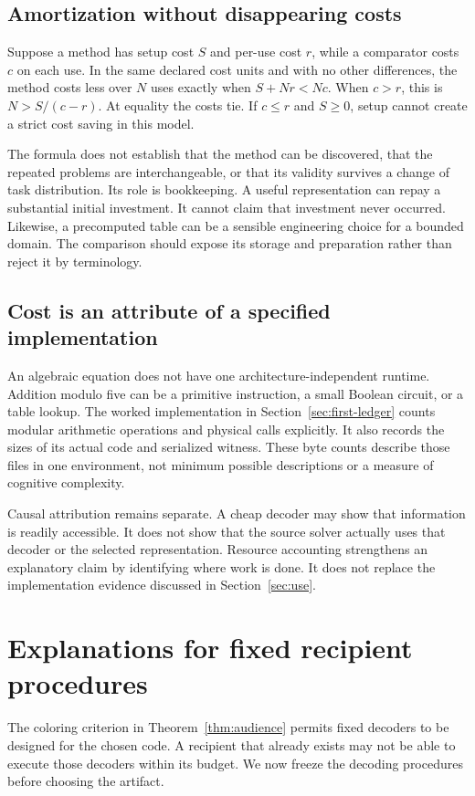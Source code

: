 \documentclass[11pt,letterpaper]{article}
\theoremstyle{plain}
\theoremstyle{definition}
\begin{document}
\subsection{Amortization without disappearing costs}
Suppose a method has setup cost $S$ and per-use cost $r$, while a comparator costs $c$ on each use. In the same declared cost units and with no other differences, the method costs less over $N$ uses exactly when $S+Nr<Nc$. When $c>r$, this is $N>S/(c-r)$. At equality the costs tie. If $c\leq r$ and $S\geq0$, setup cannot create a strict cost saving in this model.

The formula does not establish that the method can be discovered, that the repeated problems are interchangeable, or that its validity survives a change of task distribution. Its role is bookkeeping. A useful representation can repay a substantial initial investment. It cannot claim that investment never occurred. Likewise, a precomputed table can be a sensible engineering choice for a bounded domain. The comparison should expose its storage and preparation rather than reject it by terminology.

\subsection{Cost is an attribute of a specified implementation}
An algebraic equation does not have one architecture-independent runtime. Addition modulo five can be a primitive instruction, a small Boolean circuit, or a table lookup. The worked implementation in Section~\ref{sec:first-ledger} counts modular arithmetic operations and physical calls explicitly. It also records the sizes of its actual code and serialized witness. These byte counts describe those files in one environment, not minimum possible descriptions or a measure of cognitive complexity.

Causal attribution remains separate. A cheap decoder may show that information is readily accessible. It does not show that the source solver actually uses that decoder or the selected representation. Resource accounting strengthens an explanatory claim by identifying where work is done. It does not replace the implementation evidence discussed in Section~\ref{sec:use}.

\section{Explanations for fixed recipient procedures}\label{sec:fixed-decoders}
The coloring criterion in Theorem~\ref{thm:audience} permits fixed decoders to be designed for the chosen code. A recipient that already exists may not be able to execute those decoders within its budget. We now freeze the decoding procedures before choosing the artifact.
\end{document}
